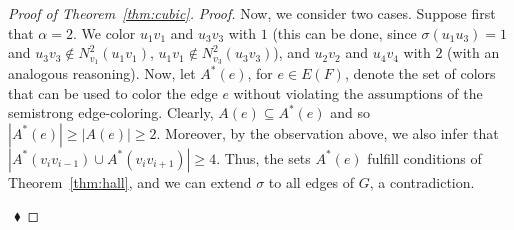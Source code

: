 \documentclass[12pt,a4paper]{article}
\newcommand{\set}[1]{\ensuremath{\left\{#1 \right\}}}
\newenvironment{proofclaim}[1][]%
    {\noindent \emph{Proof.} {}{#1}{}}{$~$\hfill $~\blacklozenge$ \vspace{0.2cm}}
\begin{document}
\begin{proof}[Proof of Theorem~\ref{thm:cubic}]
\begin{proofclaim}
		Now, we consider two cases. Suppose first that $\alpha = 2$.
		We color $u_1v_1$ and $u_3v_3$ with $1$ (this can be done, since $\sigma(u_1u_3) = 1$ and $u_3v_3 \notin N_{v_1}^2(u_1v_1)$, $u_1v_1 \notin N_{v_3}^2(u_3v_3)$), 
		and $u_2v_2$ and $u_4v_4$ with $2$ (with an analogous reasoning).
		Now, let $A^*(e)$, for $e \in E(F)$, denote the set of colors that can be used to color the edge $e$ without violating the assumptions of the semistrong edge-coloring. 
		Clearly, $A(e) \subseteq A^*(e)$ and so $|A^*(e)| \ge |A(e)| \ge 2$. 
		Moreover, by the observation above, we also infer that $|A^*(v_iv_{i-1}) \cup A^*(v_iv_{i+1})| \ge 4$. 
		Thus, the sets $A^*(e)$ fulfill conditions of Theorem~\ref{thm:hall}, and we can extend $\sigma$ to all edges of $G$, a contradiction.
		

\end{proofclaim}
\end{proof}
\end{document}
